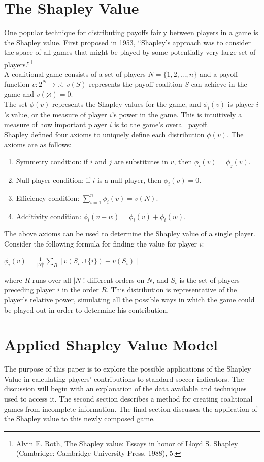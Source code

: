 \documentclass[a4paper,10pt]{article}
\newcommand{\br}{\\[10pt]}
\let\emptyset\varnothing
\begin{document}
  \section*{The Shapley Value}
  One popular technique for distributing payoffs fairly between players in a game is the Shapley value. First proposed in 1953, ``Shapley's approach was to consider the space of all games that might be played by some potentially very large set of players.''\footnote{Alvin E. Roth, The Shapley value: Essays in honor of Lloyd S. Shapley (Cambridge: Cambridge University Press, 1988), 5.}
  \br
  A coalitional game consists of a set of players $N = \{1, 2, ..., n\}$ and a payoff function $v : 2^N \rightarrow \mathbb{R}$. $v(S)$ represents the payoff coalition $S$ can achieve in the game and $v(\emptyset) = 0$. 
  \br
  The set $\phi(v)$ represents the Shapley values for the game, and $\phi_i(v)$ is player $i$'s value, or the measure of player $i$'s power in the game. This is intuitively a measure of how important player $i$ is to the game's overall payoff.
  \br
  Shapley defined four axioms to uniquely define each distribution $\phi(v)$. The axioms are as follows:
  \begin{enumerate}
    \item Symmetry condition: if $i$ and $j$ are substitutes in $v$, then $\phi_i(v) = \phi_j(v)$.
    \item Null player condition: if $i$ is a null player, then $\phi_i(v) = 0$.
    \item Efficiency condition: $\sum\limits_{i=1}^{n} \phi_i(v) = v(N)$.
    \item Additivity condition: $\phi_i(v + w) = \phi_i(v) + \phi_i(w)$.
  \end{enumerate}
  The above axioms can be used to determine the Shapley value of a single player. Consider the following formula for finding the value for player $i$:
  \begin{center}
    $\phi_i(v) = \frac{1}{|N|!} \sum\limits_{R}[v(S_i \cup \{i\}) - v(S_i)]$
  \end{center}
  where $R$ runs over all $|N|!$ different orders on $N$, and $S_i$ is the set of players preceding player $i$ in the order $R$. This distribution is representative of the player's relative power, simulating all the possible ways in which the game could be played out in order to determine his contribution.
  
  \section*{Applied Shapley Value Model}
  The purpose of this paper is to explore the possible applications of the Shapley Value in calculating players' contributions to standard soccer indicators. The discussion will begin with an explanation of the data available and techniques used to access it. The second section describes a method for creating coalitional games from incomplete information. The final section discusses the application of the Shapley value to this newly composed game.
  
\end{document}
